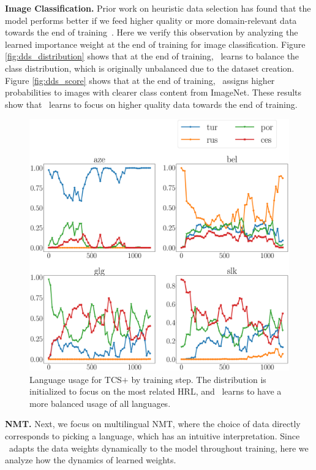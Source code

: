 \textbf{Image Classification.} Prior work on heuristic data selection has found that the model performs better if we feed higher quality or more domain-relevant data  towards the end of training~\citep{dynamic_data_selection_nmt,dynamic}. Here we verify this observation by analyzing the learned importance weight at the end of training for image classification. Figure \ref{fig:dds_distribution} shows that at the end of training, \dds~learns to balance the class distribution, which is originally unbalanced due to the dataset creation. Figure \ref{fig:dds_score} shows that at the end of training, \dds~assigns higher probabilities to images with clearer class content from ImageNet. These results show that \dds~learns to focus on higher quality data towards the end of training.  
\begin{figure}
    \centering
    \includegraphics[width=\columnwidth]{figs/hs_prob_plot.eps}
    \caption{\label{fig:nmt_distrib_hs}Language usage for TCS$+$\dds{} by training step. The distribution is initialized to focus on the most related HRL, and \dds~learns to have a more balanced usage of all languages.}
\end{figure}

\textbf{NMT.}
Next, we focus on multilingual NMT, where the choice of data directly corresponds to picking a language, which has an intuitive interpretation. Since \dds~adapts the data weights dynamically to the model throughout training, here we analyze how the dynamics of learned weights.

